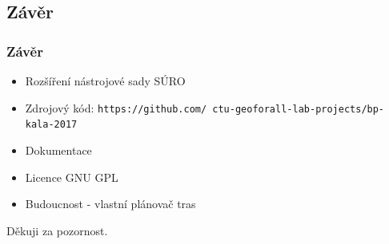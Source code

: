 \documentclass{beamer}
\begin{document}
\begin{frame}
\section{Závěr}
\frametitle{Závěr}
\begin{itemize}
	\item Rozšíření nástrojové sady SÚRO
	\item Zdrojový kód: \texttt{https://github.com/ ctu-geoforall-lab-projects/bp-kala-2017}
	\item Dokumentace 
	\item Licence GNU GPL
	\item Budoucnost - vlastní plánovač tras 
\end{itemize}
\end{frame}

\begin{frame}
\Huge{\centerline{Děkuji za pozornost.}}


\end{frame}




\end{document}
